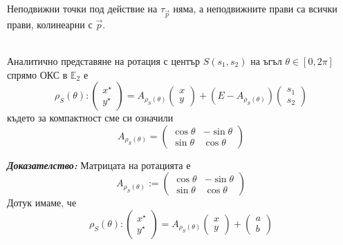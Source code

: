 \documentclass[12pt]{article}
\begin{document}
Неподвижни точки под действие на $\tau_{\vec{p}}$ няма, а неподвижните прави са всички прави, колинеарни с $\vec{p}$.
\\
\\
\begin{tcolorbox}[
    colback=blue!5,    %
    colframe=blue!75!black, %
    title={\textbf{Твърдение 17:}}, %
    fonttitle=\bfseries,
    boxrule=0.8pt,
    arc=1mm,           %
    top=2mm, bottom=2mm, left=3mm, right=3mm
]  Аналитично представяне на ротация с център $S(s_1,s_2)$ на ъгъл $\theta\in[0,2\pi]$ спрямо ОКС в $\mathbb{E}_2$ е $$\rho_S(\theta):\begin{pmatrix} x^\star \\ y^{\star}\end{pmatrix}=A_{\rho_S(\theta)}\begin{pmatrix} x \\ y\end{pmatrix}+(E-A_{\rho_S(\theta)})\begin{pmatrix} s_1 \\ s_2\end{pmatrix}$$ където за компактност сме си означили $$A_{\rho_S(\theta)}=\begin{pmatrix}\cos\theta & -\sin\theta \\ \sin\theta & \cos\theta\end{pmatrix}$$
\end{tcolorbox}
\textbf{\textit{Доказателство:}} Матрицата на ротацията е $$A_{\rho_S(\theta)}:=\begin{pmatrix}\cos\theta & -\sin\theta \\ \sin\theta & \cos\theta\end{pmatrix}$$
Дотук имаме, че $$\rho_S(\theta):\begin{pmatrix} x^\star \\ y^{\star}\end{pmatrix}=A_{\rho_S(\theta)}\begin{pmatrix} x \\ y\end{pmatrix}+\begin{pmatrix} a \\ b\end{pmatrix}$$
\end{document}
